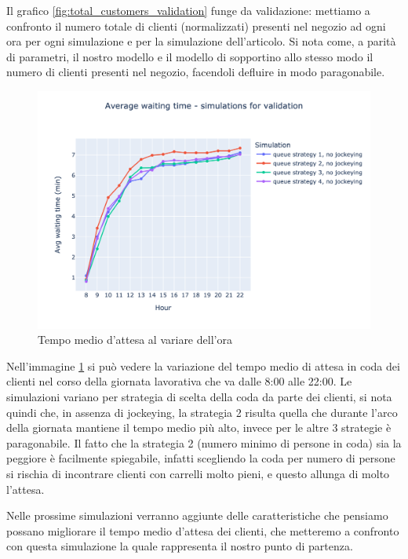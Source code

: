 Il grafico \ref{fig:total_customers_validation} funge da validazione: mettiamo a confronto il numero totale di clienti (normalizzati) presenti nel negozio ad ogni ora per ogni simulazione e per la simulazione dell'articolo. Si nota come, a parità di parametri, il nostro modello e il modello di \cite{article1} sopportino allo stesso modo il numero di clienti presenti nel negozio, facendoli defluire in modo paragonabile.

\begin{figure}[H]
	\centering
	\includegraphics[width=12cm]{"images/results/avg_wt_validation.png"}
	\caption{Tempo medio d'attesa al variare dell'ora}
	\label{fig:avg_wt_validation}
\end{figure}


Nell'immagine \ref{fig:avg_wt_validation} si può vedere la variazione del tempo medio di attesa in coda dei clienti nel corso della giornata lavorativa che va dalle 8:00 alle 22:00. Le simulazioni variano per strategia di scelta della coda da parte dei clienti, si nota quindi che, in assenza di jockeying, la strategia 2 risulta quella che durante l'arco della giornata mantiene il tempo medio più alto, invece per le altre 3 strategie è paragonabile. Il fatto che la strategia 2 (numero minimo di persone in coda) sia la peggiore è facilmente spiegabile, infatti scegliendo la coda per numero di persone si rischia di incontrare clienti con carrelli molto pieni, e questo allunga di molto l'attesa.

Nelle prossime simulazioni verranno aggiunte delle caratteristiche che pensiamo possano migliorare il tempo medio d'attesa dei clienti, che metteremo a confronto con questa simulazione la quale rappresenta il nostro punto di partenza.

